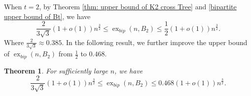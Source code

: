 \documentclass[11pt,a4paper]{article}
\newtheorem{theorem}{Theorem}[section]
\theoremstyle{definition}
\DeclareMathOperator{\ex}{ex}
\begin{document}







        When $t = 2$, by Theorem \ref{thm: upper bound of K2 cross Tree} and \ref{bipartite upper bound of Bt}, we have $$ \frac{2}{3\sqrt{3}} (1+o(1)) n^{\frac{3}{2}} \leq \ex_{bip}(n ,B_2) \leq \frac{1}{2}(1+o(1))n^{\frac{3}{2}}.$$
        Where $\frac{2}{3\sqrt{3}}\approx 0.385$.
        In the following result, we further improve the upper bound of $\ex_{bip}(n, B_2)$ from $\frac{1}{2}$ to $0.468$.
        
        \begin{theorem}\label{thm: bipartite upper and lower bound of B2}
        For sufficiently large $n$, we have
            $$\frac{2}{3\sqrt{3}} (1+o(1))n^{\frac{3}{2}}\leq \ex_{bip}(n,B_2)\leq 0.468(1+o(1))n^{\frac{3}{2}}.$$
        \end{theorem}
\end{document}
